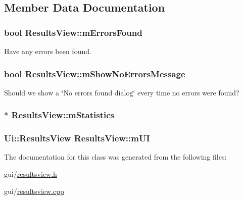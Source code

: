 \subsection{Member Data Documentation}
\hypertarget{class_results_view_afbb19855b2d5c8607e94abafef54d0df}{
\subsubsection[{m\-Errors\-Found}]{\setlength{\rightskip}{0pt plus 5cm}bool Results\-View\-::m\-Errors\-Found\hspace{0.3cm}{\ttfamily [protected]}}}\label{class_results_view_afbb19855b2d5c8607e94abafef54d0df}


Have any errors been found. 

\hypertarget{class_results_view_a51d04dc3d41eccb2185d9ab040ec60a0}{
\subsubsection[{m\-Show\-No\-Errors\-Message}]{\setlength{\rightskip}{0pt plus 5cm}bool Results\-View\-::m\-Show\-No\-Errors\-Message\hspace{0.3cm}{\ttfamily [protected]}}}\label{class_results_view_a51d04dc3d41eccb2185d9ab040ec60a0}


Should we show a \char`\"{}\-No errors found dialog\char`\"{} every time no errors were found? 

\hypertarget{class_results_view_a8435cbf011fd46daa4173a05c98af4e5}{
\subsubsection[{m\-Statistics}]{$\ast$ Results\-View\-::m\-Statistics\hspace{0.3cm}{\ttfamily [protected]}}}\label{class_results_view_a8435cbf011fd46daa4173a05c98af4e5}
\hypertarget{class_results_view_a69707109fdfa05850933fac204462c6e}{
\subsubsection[{m\-U\-I}]{\setlength{\rightskip}{0pt plus 5cm}Ui\-::\-Results\-View Results\-View\-::m\-U\-I\hspace{0.3cm}{\ttfamily [protected]}}}\label{class_results_view_a69707109fdfa05850933fac204462c6e}


The documentation for this class was generated from the following files\-:\begin{DoxyCompactItemize}
\item 
gui/\hyperlink{resultsview_8h}{resultsview.\-h}\item 
gui/\hyperlink{resultsview_8cpp}{resultsview.\-cpp}\end{DoxyCompactItemize}
